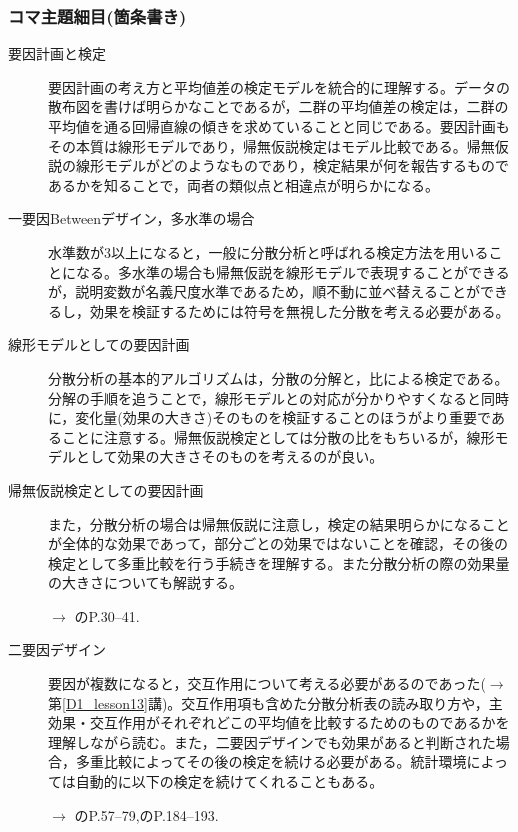 \subsubsection{コマ主題細目(箇条書き)}
\begin{description}

\item[要因計画と検定]要因計画の考え方と平均値差の検定モデルを統合的に理解する。データの散布図を書けば明らかなことであるが，二群の平均値差の検定は，二群の平均値を通る回帰直線の傾きを求めていることと同じである。要因計画もその本質は線形モデルであり，帰無仮説検定はモデル比較である。帰無仮説の線形モデルがどのようなものであり，検定結果が何を報告するものであるかを知ることで，両者の類似点と相違点が明らかになる。

\item[一要因Betweenデザイン，多水準の場合]水準数が3以上になると，一般に分散分析と呼ばれる検定方法を用いることになる。多水準の場合も帰無仮説を線形モデルで表現することができるが，説明変数が名義尺度水準であるため，順不動に並べ替えることができるし，効果を検証するためには符号を無視した分散を考える必要がある。
\item[線形モデルとしての要因計画]分散分析の基本的アルゴリズムは，分散の分解と，比による検定である。分解の手順を追うことで，線形モデルとの対応が分かりやすくなると同時に，変化量(効果の大きさ)そのものを検証することのほうがより重要であることに注意する。帰無仮説検定としては分散の比をもちいるが，線形モデルとして効果の大きさそのものを考えるのが良い。 

\item[帰無仮説検定としての要因計画]また，分散分析の場合は帰無仮説に注意し，検定の結果明らかになることが全体的な効果であって，部分ごとの効果ではないことを確認，その後の検定として多重比較を行う手続きを理解する。また分散分析の際の効果量の大きさについても解説する。
\begin{flushright}
    $\to$ \citet{橋本201607} のP.30--41.
\end{flushright}

\item[二要因デザイン]要因が複数になると，交互作用について考える必要があるのであった($\to$第\ref{D1_lesson13}講)。交互作用項も含めた分散分析表の読み取り方や，主効果・交互作用がそれぞれどこの平均値を比較するためのものであるかを理解しながら読む。また，二要因デザインでも効果があると判断された場合，多重比較によってその後の検定を続ける必要がある。統計環境によっては自動的に以下の検定を続けてくれることもある。
\begin{flushright}
    $\to$ \citet{橋本201607} のP.57--79,\citet{Yamada2004}のP.184--193.
\end{flushright}

\end{description}
